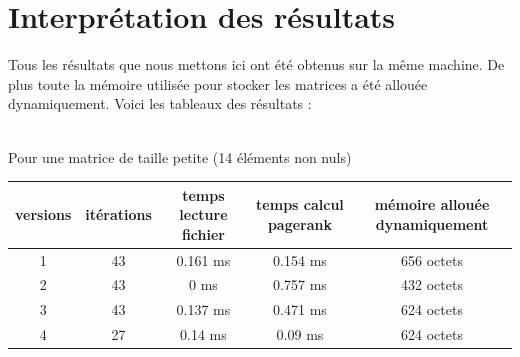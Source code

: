 \documentclass[10pt,a4paper]{article}
\begin{document}
\section{Interprétation des résultats}
Tous les résultats que nous mettons ici ont été obtenus sur la même machine. De plus toute la mémoire utilisée pour stocker les matrices a été allouée dynamiquement. Voici les tableaux des résultats :
\\
\\
\begin{center}
Pour une matrice de taille petite (14 éléments non nuls)
\end{center}
\begin{tabular}{| c | c | c | c | c |}
\hline
versions & itérations & temps lecture fichier & temps calcul pagerank & mémoire allouée dynamiquement \\
\hline
1 & 43 & 0.161 ms & 0.154 ms & 656 octets \\
2 & 43 & 0 ms & 0.757 ms & 432 octets\\
3 & 43 & 0.137 ms & 0.471 ms & 624 octets\\
4 & 27 & 0.14 ms & 0.09 ms & 624 octets\\
\hline	
\end{tabular}
\end{document}
